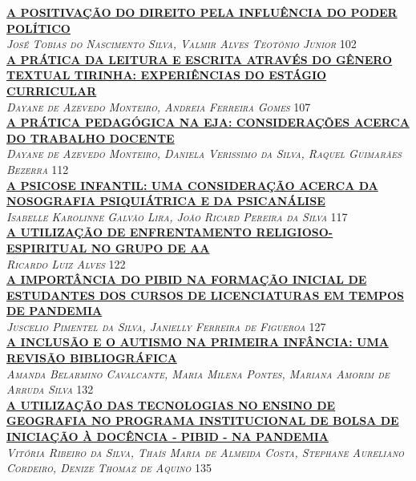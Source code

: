 \noindent \textsc{\hyperlink{trabalhos/242576.pdf.1}{\textbf{A POSITIVAÇÃO DO DIREITO PELA INFLUÊNCIA DO PODER POLÍTICO}}}\\ 
\noindent \textsc{\textit{José Tobias do Nascimento Silva, Valmir Alves Teotônio Junior}} \hfill 102\\ 

\noindent \textsc{\hyperlink{trabalhos/251290.pdf.1}{\textbf{A PRÁTICA DA LEITURA E ESCRITA ATRAVÉS DO GÊNERO TEXTUAL TIRINHA: EXPERIÊNCIAS DO ESTÁGIO CURRICULAR}}}\\ 
\noindent \textsc{\textit{Dayane de Azevedo Monteiro, Andreia Ferreira Gomes}} \hfill 107\\ 

\noindent \textsc{\hyperlink{trabalhos/250180.pdf.1}{\textbf{A PRÁTICA PEDAGÓGICA NA EJA: CONSIDERAÇÕES ACERCA DO TRABALHO DOCENTE}}}\\ 
\noindent \textsc{\textit{Dayane de Azevedo Monteiro, Daniela Verissimo da Silva, Raquel Guimarães Bezerra}} \hfill 112\\ 

\noindent \textsc{\hyperlink{trabalhos/249272.pdf.1}{\textbf{A PSICOSE INFANTIL: UMA CONSIDERAÇÃO ACERCA DA NOSOGRAFIA PSIQUIÁTRICA E DA PSICANÁLISE}}}\\ 
\noindent \textsc{\textit{Isabelle Karolinne Galvão Lira, João Ricard Pereira da Silva}} \hfill 117\\ 

\noindent \textsc{\hyperlink{trabalhos/249441.pdf.1}{\textbf{A UTILIZAÇÃO DE ENFRENTAMENTO RELIGIOSO-ESPIRITUAL NO GRUPO DE AA}}}\\ 
\noindent \textsc{\textit{Ricardo Luiz Alves}} \hfill 122\\ 

\noindent \textsc{\hyperlink{trabalhos/248141.pdf.1}{\textbf{A IMPORTÂNCIA DO PIBID NA FORMAÇÃO INICIAL DE ESTUDANTES DOS CURSOS DE LICENCIATURAS EM TEMPOS DE PANDEMIA}}}\\ 
\noindent \textsc{\textit{Juscelio Pimentel da Silva, Janielly Ferreira de Figueroa}} \hfill 127\\ 

\noindent \textsc{\hyperlink{trabalhos/250391.pdf.1}{\textbf{A INCLUSÃO E O AUTISMO NA PRIMEIRA INFÂNCIA: UMA REVISÃO BIBLIOGRÁFICA}}}\\ 
\noindent \textsc{\textit{Amanda Belarmino Cavalcante, Maria Milena Pontes, Mariana Amorim de Arruda Silva}} \hfill 132\\ 

\noindent \textsc{\hyperlink{trabalhos/243929.pdf.1}{\textbf{A UTILIZAÇÃO DAS TECNOLOGIAS NO ENSINO DE GEOGRAFIA NO PROGRAMA INSTITUCIONAL DE BOLSA DE INICIAÇÃO À DOCÊNCIA - PIBID - NA PANDEMIA}}}\\ 
\noindent \textsc{\textit{Vitória Ribeiro da Silva, Thaís Maria de Almeida Costa, Stephane Aureliano Cordeiro, Denize Thomaz de Aquino}} \hfill 135\\ 

